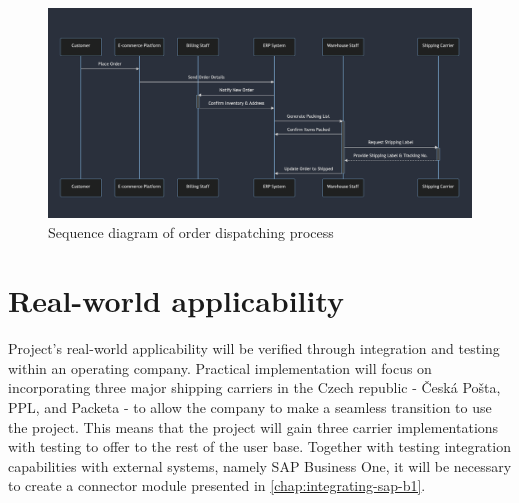 \begin{figure}[p]\centering
\includegraphics[width=140mm]{img/chap02/fig_proces_sequence_diagram.png}
\caption{Sequence diagram of order dispatching process}
\label{img02:order-dispatch-process}
\end{figure}






\section{Real-world applicability}
\label{sec:real-world-applicability}
Project's real-world applicability will be verified through integration and testing within an operating company.
Practical implementation will focus on incorporating three major shipping carriers in the Czech republic - Česká Pošta, PPL, and Packeta - to allow the company to make a seamless transition to use the project.
This means that the project will gain three carrier implementations with testing to offer to the rest of the user base.
Together with testing integration capabilities with external systems, namely SAP Business One, it will be necessary to create a connector module presented in \ref{chap:integrating-sap-b1}.

